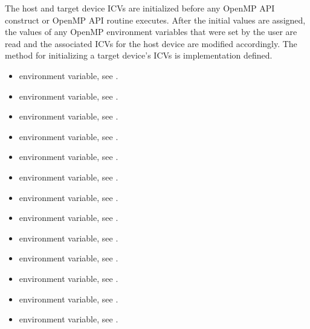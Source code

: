 The host and target device ICVs are initialized before any OpenMP API construct or
OpenMP API routine executes. After the initial values are assigned, the values of any
OpenMP environment variables that were set by the user are read and the associated
ICVs for the host device are modified accordingly. The method for initializing a target
device's ICVs is implementation defined.

\crossreferences
\begin{itemize}
\item {} environment variable, see .

\item {} environment variable, see .

\item {} environment variable, see .

\item {} environment variable, see .

\item {} environment variable, see .

\item {} environment variable, see .

\item {} environment variable, see .

\item {} environment variable, see .

\item {} environment variable, see .

\item {} environment variable, see .

\item {} environment variable, see .

\item {} environment variable, see .

\item {} environment variable, see .


\end{itemize}
